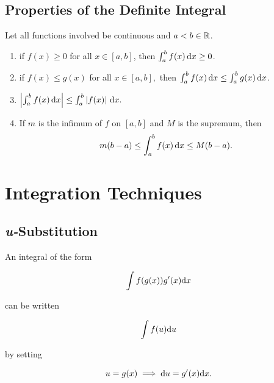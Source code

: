 \documentclass{article}
\begin{document}
  \subsection{Properties of the Definite Integral}

  \begin{prop}
    \everymath{\displaystyle}
    Let all functions involved be continuous and \(a < b \in \mathbb{R}\).
    \begin{enumerate}
      \item if \(f(x) \geq 0\) for all \(x \in [a,b]\), then \(\int_{a}^{b}f(x) \, \mathrm{d} x \geq 0\).
      \item if \(f(x) \leq g(x)\) for all \(x \in [a,b],\) then \(\int_{a}^{b}f(x) \, \mathrm{d} x \leq \int_{a}^{b}g(x) \, \mathrm{d} x\).
      \item \(\left\lvert \int_{a}^{b}f(x) \, \mathrm{d} x\right\rvert \leq \int_{a}^{b}\left\lvert f(x)\right\rvert \, \mathrm{d} x.\)
      \item If \(m\) is the infimum of \(f\) on \([a,b]\) and \(M\) is the supremum, then \[
        m(b-a) \leq \int_{a}^{b}f(x) \, \mathrm{d} x \leq M(b-a).
      \]
    \end{enumerate}
  \end{prop}

  \pagebreak

  \section{Integration Techniques}
  \subsection{\emph{u-}Substitution}

  An integral of the form 

  \[
    \int{f(g(x))g'(x) \mathrm{d}x}
  \]

  can be written 
  
  \[
    \int{f(u) \mathrm{d}u}
  \]

  by setting 

  \[
    u = g(x) \implies \mathrm{d} u = g'(x) \mathrm{d} x.
  \]
\end{document}
